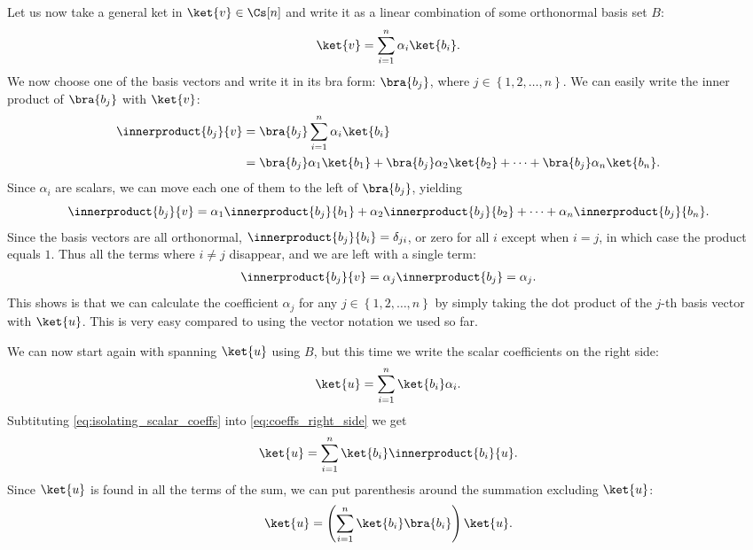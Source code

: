Let us now take a general ket in $\ket{v}\in\Cs[n]$ and write it as a linear combination of some orthonormal basis set $B$:
\begin{equation}
	\ket{v} = \sum\limits_{i=1}^{n}\alpha_{i}\ket{b_{i}}.
	\label{eq:}
\end{equation}
We now choose one of the basis vectors and write it in its bra form: $\bra{b_{j}}$, where $j\in\left\{1,2,\dots,n\right\}$. We can easily write the inner product of $\bra{b_{j}}$ with $\ket{v}$:
\begin{align}
	\innerproduct{b_{j}}{v} &= \bra{b_{j}}\sum\limits_{i=1}^{n}\alpha_{i}\ket{b_{i}}\nonumber\\
	&= \bra{b_{j}}\alpha_{1}\ket{b_{1}} + \bra{b_{j}}\alpha_{2}\ket{b_{2}} + \dots + \bra{b_{j}}\alpha_{n}\ket{b_{n}}.
	\label{eq:}
\end{align}
Since $\alpha_{i}$ are scalars, we can move each one of them to the left of $\bra{b_{j}}$, yielding
\begin{equation}
	\innerproduct{b_{j}}{v} = \alpha_{1}\innerproduct{b_{j}}{b_{1}} + \alpha_{2}\innerproduct{b_{j}}{b_{2}} + \cdots + \alpha_{n}\innerproduct{b_{j}}{b_{n}}.
	\label{eq:}
\end{equation}
Since the basis vectors are all orthonormal, $\innerproduct{b_{j}}{b_{i}}=\delta_{ji}$, or zero for all $i$ except when $i=j$, in which case the product equals $1$. Thus all the terms where $i\neq j$ disappear, and we are left with a single term:
\begin{align}
	\innerproduct{b_{j}}{v} = \alpha_{j}\innerproduct{b_{j}} = \alpha_{j}.
	\label{eq:isolating_scalar_coeffs}
\end{align}
This shows is that we can calculate the coefficient $\alpha_{j}$ for any $j\in\left\{1,2,\dots,n\right\}$ by simply taking the dot product of the $j$-th basis vector with $\ket{u}$. This is very easy compared to using the vector notation we used so far.

We can now start again with spanning $\ket{u}$ using $B$, but this time we write the scalar coefficients on the right side:
\begin{equation}
	\ket{u} = \sum\limits_{i=1}^{n}\ket{b_{i}}\alpha_{i}.
	\label{eq:coeffs_right_side}
\end{equation}
Subtituting \autoref{eq:isolating_scalar_coeffs} into \autoref{eq:coeffs_right_side} we get
\begin{equation}
	\ket{u} = \sum\limits_{i=1}^{n}\ket{b_{i}}\innerproduct{b_{i}}{u}.
	\label{eq:ket_as_sum_of_outer_products}
\end{equation}
Since $\ket{u}$ is found in all the terms of the sum, we can put parenthesis around the summation excluding $\ket{u}$:
\begin{equation}
	\ket{u} = \left(\sum\limits_{i=1}^{n}\ket{b_{i}}\bra{b_{i}}\right)\ket{u}.
	\label{eq:ket_as_sum_of_outer_products_parenthesis}
\end{equation}

